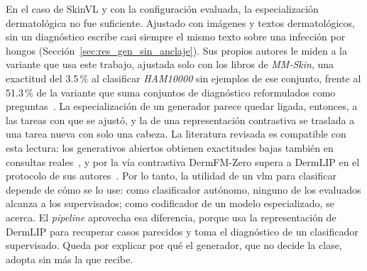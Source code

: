 En el caso de SkinVL y con la configuración evaluada, la especialización dermatológica no fue suficiente. Ajustado con imágenes y textos
dermatológicos, sin un diagnóstico escribe casi siempre el mismo texto sobre una infección por hongos
(Sección~\ref{sec:res_gen_sin_anclaje}). Sus propios autores le miden a la variante que usa este trabajo, ajustada solo
con los libros de \emph{MM-Skin}, una exactitud del 3.5\,\% al clasificar \emph{HAM10000} sin ejemplos de ese conjunto, frente al
51.3\,\% de la variante que suma conjuntos de diagnóstico reformulados como preguntas~\cite{zeng2025mmskin}. La especialización de un generador parece quedar ligada, entonces, a las tareas con que se ajustó, y la de una representación
contrastiva se traslada a una tarea nueva con solo una cabeza. La literatura revisada es compatible con esta lectura: los generativos abiertos
obtienen exactitudes bajas también en consultas reales~\cite{jiang2026multimodal}, y por la vía contrastiva
DermFM-Zero supera a DermLIP en el protocolo de sus autores~\cite{yan2026dermfmzero}. Por lo tanto, la utilidad de un
\gls{vlm} para clasificar depende de cómo se lo use: como clasificador autónomo, ninguno de los evaluados alcanza a
los supervisados; como codificador de un modelo especializado, se acerca. El \emph{pipeline} aprovecha esa diferencia,
porque usa la representación de DermLIP para recuperar casos parecidos y toma el diagnóstico de un clasificador
supervisado. Queda por explicar por qué el generador, que no decide la clase, adopta sin más la que recibe.
